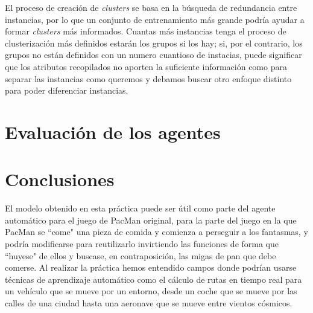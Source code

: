 \documentclass[12pt]{article}
\begin{document}
El proceso de creación de \emph{clusters} se basa en la búsqueda de redundancia entre instancias, por lo que un conjunto de entrenamiento más grande podría ayudar a formar \emph{clusters} más informados. Cuantas más instancias tenga el proceso de clusterización más definidos estarán los grupos si los hay; si, por el contrario, los grupos no están definidos con un numero cuantioso de instacias, puede significar que los atributos recopilados no aporten la suficiente información como para separar las instancias como queremos y debamos buscar otro enfoque distinto para poder diferenciar instancias.

\newpage
\section{Evaluación de los agentes}





\newpage
\section{Conclusiones}

El modelo obtenido en esta práctica puede ser útil como parte del agente automático para el juego de PacMan original, para la parte del juego en la que PacMan se ``come" una pieza de comida y comienza a perseguir a los fantasmas, y podría modificarse para reutilizarlo invirtiendo las funciones de forma que ``huyese" de ellos y buscase, en contraposición, las migas de pan que debe comerse.
Al realizar la práctica hemos entendido campos donde podrían usarse técnicas de aprendizaje automático como el cálculo de rutas en tiempo real para un vehículo que se mueve por un entorno, desde un coche que se mueve por las calles de una ciudad hasta una aeronave que se mueve entre vientos cósmicos.
\end{document}
